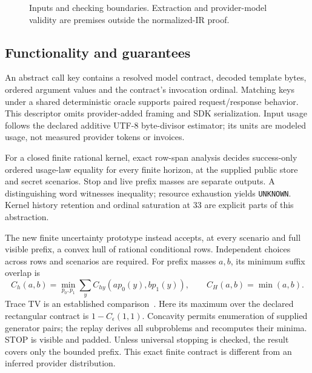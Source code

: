 \documentclass[preprint,12pt,a4paper]{elsarticle}
\begin{document}
\begin{figure}[h]
\centering
{}
\caption{Inputs and checking boundaries. Extraction and provider-model validity are premises outside the normalized-IR proof.}
\end{figure}

\subsection{Functionality and guarantees}
An abstract call key contains a resolved model contract, decoded template bytes, ordered argument values and the contract's invocation ordinal. Matching keys under a shared deterministic oracle supports paired request/response behavior. This descriptor omits provider-added framing and SDK serialization. Input usage follows the declared additive UTF-8 byte-divisor estimator; its units are modeled usage, not measured provider tokens or invoices.

For a closed finite rational kernel, exact row-span analysis decides success-only ordered usage-law equality for every finite horizon, at the supplied public store and secret scenarios. Stop and live prefix masses are separate outputs. A distinguishing word witnesses inequality; resource exhaustion yields \texttt{UNKNOWN}. Kernel history retention and ordinal saturation at 33 are explicit parts of this abstraction.

The new finite uncertainty prototype instead accepts, at every scenario and full visible prefix, a convex hull of rational conditional rows. Independent choices across rows and scenarios are required. For prefix masses $a,b$, its minimum suffix overlap is
\[
C_h(a,b)=\min_{p_0,p_1}\sum_y C_{hy}(a p_0(y),b p_1(y)),
\qquad C_H(a,b)=\min(a,b).
\]
Trace TV is an established comparison~\cite{chen}. Here its maximum over the declared rectangular contract is $1-C_{\epsilon}(1,1)$. Concavity permits enumeration of supplied generator pairs; the replay derives all subproblems and recomputes their minima. STOP is visible and padded. Unless universal stopping is checked, the result covers only the bounded prefix. This exact finite contract is different from an inferred provider distribution.
\end{document}
